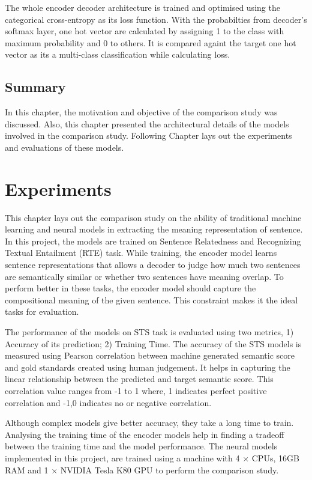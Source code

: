 \documentclass[12pt]{report} %
\begin{document}
	The whole encoder decoder architecture is trained  and optimised using the categorical cross-entropy as its loss function. With the probabilties from decoder's softmax layer, one hot vector are calculated by assigning 1 to the class with maximum probability and 0 to others. It is compared againt the target one hot vector as its a multi-class classification while calculating loss.
	
	\section{Summary}
	In this chapter, the motivation and objective of the comparison study was discussed. Also, this chapter presented the architectural details of the models involved in the comparison study. Following Chapter lays out the experiments and evaluations of these models.
	
	  
	 
\chapter{Experiments}

 This chapter lays out the comparison study on the ability of traditional machine learning and neural models in extracting the meaning representation of sentence. In this project, the models are trained on Sentence Relatedness and Recognizing Textual Entailment (RTE) task. While training, the encoder model learns sentence representations that allows a decoder to judge how much two sentences are semantically similar or whether two sentences have meaning overlap. To perform better in these tasks, the encoder model should capture the compositional meaning of the given sentence. This constraint makes it the ideal tasks for evaluation. 
 
 
 The performance of the models on STS task is evaluated using two metrics, 1) Accuracy of its prediction; 2) Training Time. The accuracy of the STS models is measured using Pearson correlation between machine generated semantic score and gold standards created using human judgement. It helps in capturing the linear relationship between the predicted and target semantic score. This correlation value ranges from -1 to 1 where, 1 indicates perfect positive correlation and -1,0 indicates no or negative correlation.
 
 Although complex models give better accuracy, they take a long time to train. Analysing the training time of the encoder models help in finding a tradeoff between the training time and the model performance. The neural models implemented in this project, are trained using a machine with 4 $\times$ CPUs, 16GB RAM and 1 $\times$ NVIDIA Tesla K80 GPU to perform the comparison study.
 
\end{document}
